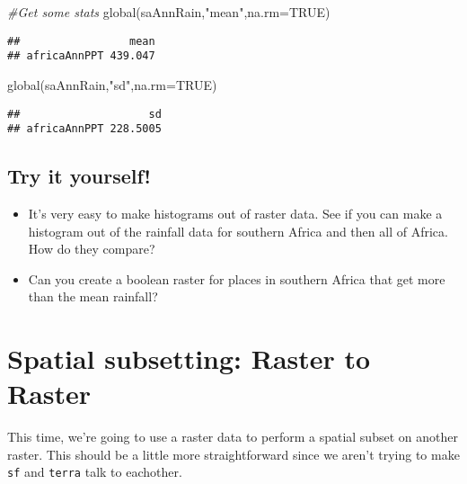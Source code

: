 \documentclass[
]{book}
\newenvironment{Shaded}{\begin{snugshade}}{\end{snugshade}}
\newcommand{\AttributeTok}[1]{\textcolor[rgb]{0.77,0.63,0.00}{#1}}
\newcommand{\CommentTok}[1]{\textcolor[rgb]{0.56,0.35,0.01}{\textit{#1}}}
\newcommand{\ConstantTok}[1]{\textcolor[rgb]{0.00,0.00,0.00}{#1}}
\newcommand{\FunctionTok}[1]{\textcolor[rgb]{0.00,0.00,0.00}{#1}}
\newcommand{\NormalTok}[1]{#1}
\newcommand{\StringTok}[1]{\textcolor[rgb]{0.31,0.60,0.02}{#1}}
\providecommand{\tightlist}{%
  \setlength{\itemsep}{0pt}\setlength{\parskip}{0pt}}
\begin{document}
\begin{Shaded}
\begin{Highlighting}[]
\CommentTok{\#Get some stats}
\FunctionTok{global}\NormalTok{(saAnnRain,}\StringTok{"mean"}\NormalTok{,}\AttributeTok{na.rm=}\ConstantTok{TRUE}\NormalTok{)}
\end{Highlighting}
\end{Shaded}

\begin{verbatim}
##                 mean
## africaAnnPPT 439.047
\end{verbatim}

\begin{Shaded}
\begin{Highlighting}[]
\FunctionTok{global}\NormalTok{(saAnnRain,}\StringTok{"sd"}\NormalTok{,}\AttributeTok{na.rm=}\ConstantTok{TRUE}\NormalTok{)}
\end{Highlighting}
\end{Shaded}

\begin{verbatim}
##                    sd
## africaAnnPPT 228.5005
\end{verbatim}

\hypertarget{try-it-yourself}{%
\section{Try it yourself!}\label{try-it-yourself}}

\begin{itemize}
\tightlist
\item
  It's very easy to make histograms out of raster data. See if you can make a histogram out of the rainfall data for southern Africa and then all of Africa. How do they compare?
\item
  Can you create a boolean raster for places in southern Africa that get more than the mean rainfall?
\end{itemize}

\hypertarget{spatial-subsetting-raster-to-raster}{%
\chapter{Spatial subsetting: Raster to Raster}\label{spatial-subsetting-raster-to-raster}}

This time, we're going to use a raster data to perform a spatial subset on another raster. This should be a little more straightforward since we aren't trying to make \texttt{sf} and \texttt{terra} talk to eachother.
\end{document}
